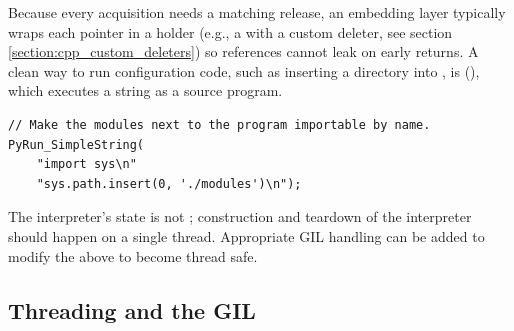 Because every acquisition needs a matching release, an embedding layer typically wraps each  pointer in a  holder (e.g., a  with a custom deleter, see section \ref{section:cpp_custom_deleters}) so references cannot leak on early returns. A clean way to run configuration code, such as inserting a directory into , is (), which executes a string as a source program.
\begin{lstlisting}
// Make the modules next to the program importable by name.
PyRun_SimpleString(
    "import sys\n"
    "sys.path.insert(0, './modules')\n");
\end{lstlisting}
The interpreter's state is not ; construction and teardown of the interpreter should happen on a single thread. Appropriate GIL handling can be added to modify the above to become thread safe.

\subsection{Threading and the GIL}

